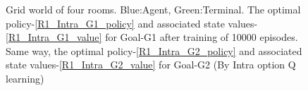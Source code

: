 \documentclass[preprint,12pt]{elsarticle}
\begin{document}
\begin{figure}[H]
	\centering  
	\caption{Grid world of four rooms.  Blue:Agent, Green:Terminal. The optimal policy-\ref{R1_Intra_G1_policy} and associated state values-\ref{R1_Intra_G1_value} for Goal-G1 after training of 10000 episodes. Same way, the optimal policy-\ref{R1_Intra_G2_policy} and associated state values-\ref{R1_Intra_G2_value} for Goal-G2 (By Intra option Q learning)}
	\label{fig:R1_Intra}
\end{figure}
\end{document}
